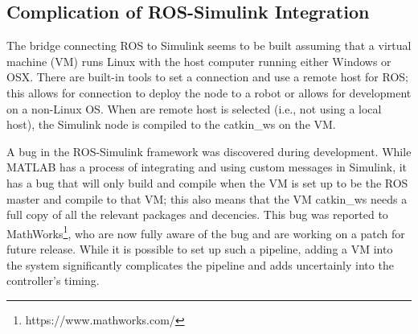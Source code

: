 



\subsection{Complication of ROS-Simulink Integration}

The bridge connecting ROS to Simulink seems to be built assuming that a virtual machine (VM) runs Linux with the host computer running either Windows or OSX. There are built-in tools to set a connection and use a remote host for ROS; this allows for connection to deploy the node to a robot or allows for development on a non-Linux OS. When are remote host is selected (i.e., not using a local host), the Simulink node is compiled to the catkin\_ws on the VM. 

A bug in the ROS-Simulink framework was discovered during development. While MATLAB has a process of integrating and using custom messages in Simulink, it has a bug that will only build and compile when the VM is set up to be the ROS master and compile to that VM; this also means that the VM catkin\_ws needs a full copy of all the relevant packages and decencies. This bug was reported to MathWorks\footnote{https://www.mathworks.com/}, who are now fully aware of the bug and are working on a patch for future release. While it is possible to set up such a pipeline, adding a VM into the system significantly complicates the pipeline and adds uncertainly into the controller's timing. 








